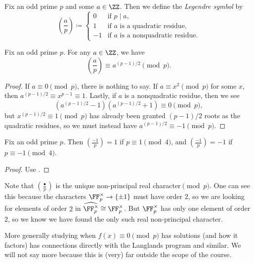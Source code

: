 \documentclass[../notes.tex]{subfiles}
\begin{document}
\begin{definition}
	Fix an odd prime $p$ and some $a\in\ZZ$. Then we define the \textit{Legendre symbol} by
	\[\left(\frac ap\right)\coloneqq\begin{cases}
		0 & \text{if }p\mid a, \\
		1 & \text{if }a\text{ is a quadratic residue}, \\
		-1 & \text{if }a\text{ is a nonquadratic residue}.
	\end{cases}\]
\end{definition}
\begin{proposition} \label{prop:euler-criterion}
	Fix an odd prime $p$. For any $a\in\ZZ$, we have
	\[\left(\frac ap\right)\equiv a^{(p-1)/2}\pmod p.\]
\end{proposition}
\begin{proof}
	If $a\equiv0\pmod p$, there is nothing to say. If $a\equiv x^2\pmod p$ for some $x$, then $a^{(p-1)/2}\equiv x^{p-1}\equiv 1$. Lastly, if $a$ is a nonquadratic residue, then we see
	\[\left(a^{(p-1)/2}-1\right)\left(a^{(p-1)/2}+1\right)\equiv0\pmod p,\]
	but $x^{(p-1)/2}\equiv1\pmod p$ has already been granted $(p-1)/2$ roots as the quadratic residues, so we must instead have $a^{(p-1)/2}\equiv-1\pmod p$.
\end{proof}
\begin{corollary}
	Fix an odd prime $p$. Then $\left(\frac{-1}p\right)=1$ if $p\equiv1\pmod 4$, and $\left(\frac{-1}p\right)=-1$ if $p\equiv-1\pmod 4$.
\end{corollary}
\begin{proof}
	Use .
\end{proof}
\begin{remark}
	Note that $\left(\frac{\bullet}p\right)$ is the unique non-principal real character$\pmod p$. One can see this because the characters $\FF_p^\times\to\{\pm1\}$ must have order $2$, so we are looking for elements of order $2$ in $\widehat{\FF_p^\times}\cong\FF_p^\times$. But $\FF_p^\times$ has only one element of order $2$, so we know we have found the only such real non-principal character.
\end{remark}
\begin{remark}
	More generally studying when $f(x)\equiv0\pmod p$ has solutions (and how it factors) has connections directly with the Langlands program and similar. We will not say more because this is (very) far outside the scope of the course.
\end{remark}
\end{document}
